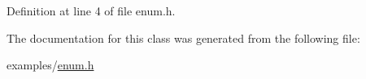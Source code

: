 Definition at line 4 of file enum.\+h.


\begin{DoxyCode}{0}

\end{DoxyCode}


The documentation for this class was generated from the following file\+:\begin{DoxyCompactItemize}
\item 
examples/\mbox{\hyperlink{enum_8h}{enum.\+h}}\end{DoxyCompactItemize}
